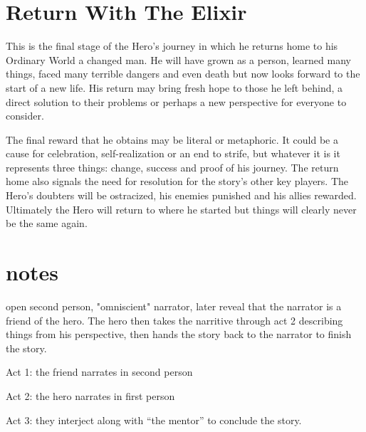 \documentclass[oneside]{book}
\begin{document}
\newpage

\chapter{Return With The Elixir}

This is the final stage of the Hero's journey in which he returns home to his Ordinary World a changed man. He will have grown as a person, learned many things, faced many terrible dangers and even death but now looks forward to the start of a new life. His return may bring fresh hope to those he left behind, a direct solution to their problems or perhaps a new perspective for everyone to consider.

The final reward that he obtains may be literal or metaphoric. It could be a cause for celebration, self-realization or an end to strife, but whatever it is it represents three things: change, success and proof of his journey. The return home also signals the need for resolution for the story's other key players. The Hero's doubters will be ostracized, his enemies punished and his allies rewarded. Ultimately the Hero will return to where he started but things will clearly never be the same again.



\newpage


\appendix

\chapter{notes}

open second person, "omniscient" narrator, later reveal that the narrator is a friend of the hero. The hero then takes the narritive through act 2 describing things from his perspective, then hands the story back to the narrator to finish the story. 

Act 1: the friend narrates in second person

Act 2: the hero narrates in first person

Act 3: they interject along with ``the mentor'' to conclude the story. 
\end{document}
